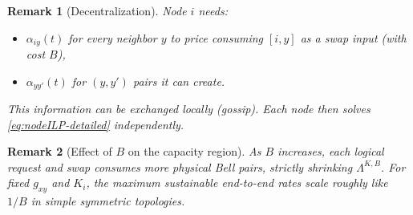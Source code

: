 \documentclass[11pt]{article}
\newtheorem{remark}{Remark}
\begin{document}
\begin{remark}[Decentralization]
Node $i$ needs:
\begin{itemize}[leftmargin=2em]
\item $\alpha_{iy}(t)$ for every neighbor $y$ to price consuming $[i,y]$ as a swap input (with cost $B$),
\item $\alpha_{yy'}(t)$ for $(y,y')$ pairs it can create.
\end{itemize}
This information can be exchanged locally (gossip). Each node then solves \eqref{eq:nodeILP-detailed} independently.
\end{remark}

\begin{remark}[Effect of $B$ on the capacity region]
As $B$ increases, each logical request and swap consumes more physical Bell pairs, strictly shrinking $\Lambda^{K,B}$. For fixed $g_{xy}$ and $K_i$, the maximum sustainable end-to-end rates scale roughly like $1/B$ in simple symmetric topologies.
\end{remark}
\end{document}
